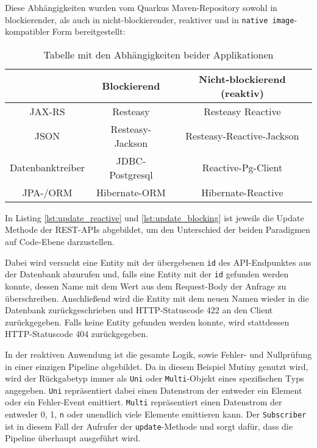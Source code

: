 Diese Abhängigkeiten wurden vom Quarkus Maven-Repository sowohl in blockierender,
als auch in nicht-blockierender, reaktiver und in \verb|native image|-kompatibler Form bereitgestellt: \parencite{MavenQuarkusIO}
\setlength{\tabcolsep}{18pt}
\renewcommand{\arraystretch}{1.5}
\begin{table}[ht!]
    \centering
    \begin{tabular}{| c | c | c |}
        \hline
                         & Blockierend      & Nicht-blockierend (reaktiv) \\
        \hline
        JAX-RS           & Resteasy         & Resteasy Reactive           \\
        \hline
        JSON             & Resteasy-Jackson & Resteasy-Reactive-Jackson   \\
        \hline
        Datenbanktreiber & JDBC-Postgresql  & Reactive-Pg-Client          \\
        \hline
        JPA-/ORM         & Hibernate-ORM    & Hibernate-Reactive          \\
        \hline
    \end{tabular}
    \caption{Tabelle mit den Abhängigkeiten beider Applikationen}
    \label{table:dependencies}
\end{table}

In Listing \ref{lst:update_reactive} und \ref{lst:update_blocking} ist jeweils die Update Methode der REST-APIs abgebildet, um den
Unterschied der beiden Paradigmen auf Code-Ebene darzustellen.

Dabei wird versucht eine Entity mit der übergebenen \verb|id| des API-Endpunktes
aus der Datenbank abzurufen und, falls eine Entity mit der \verb|id| gefunden werden konnte, dessen Name mit dem Wert
aus dem Request-Body der Anfrage zu überschreiben. Anschließend wird die Entity mit dem neuen Namen wieder in die Datenbank zurückgeschrieben
und HTTP-Statuscode 422 an den Client zurückgegeben. Falls keine Entity gefunden werden konnte, wird stattdessen
HTTP-Statuscode 404 zurückgegeben.

In der reaktiven Anwendung ist die gesamte Logik, sowie Fehler- und Nullprüfung in einer einzigen Pipeline abgebildet.
Da in diesem Beispiel Mutiny genutzt wird, wird der Rückgabetyp immer als \verb|Uni| oder \verb|Multi|-Objekt eines spezifischen Typs
angegeben. \verb|Uni| repräsentiert dabei einen Datenstrom der entweder ein Element oder ein Fehler-Event emittiert.
\verb|Multi| repräsentiert einen Datenstrom der entweder 0, 1, \verb|n| oder unendlich viele Elemente emittieren kann.
Der \verb|Subscriber| ist in diesem Fall der Aufrufer der \verb|update|-Methode und sorgt dafür, dass die Pipeline überhaupt ausgeführt wird.

